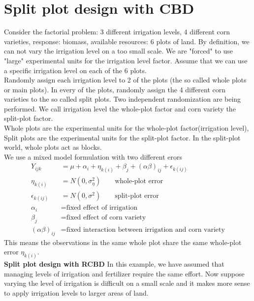 
 \section{Split plot design with CBD} 
 
 Consider the factorial problem: 3 different irrigation levels, 4 different corn varieties, response: biomass, available resources: 6 plots of land. By definition, we can not vary the irrigation level on a too small scale. We are "forced" to use "large" experimental units for the irrigation level factor. Assume that we can use a specific irrigation level on each of the 6 plots.\\
Randomly assign each irrigation level to 2 of the plots (the so called whole plots or main plots). In every of the plots, randomly assign the 4 different corn varieties to the so called split plots. Two independent randomization are being performed. We call irrigation level the whole-plot factor and corn variety the split-plot factor.\\
Whole plots are the experimental units for the whole-plot factor(irrigation level), Split plots are the experimental units for the split-plot factor. In the split-plot world, whole plots act as blocks. \\
We use a mixed model formulation with two different erors\\
\begin{align*}
Y_{ijk} &= \mu + \alpha_i + \eta_{k(i)} + \beta_j + (\alpha\beta)_{ij} + \epsilon_{k(ij)}\\
\eta_{k(i)} &= N(0, \sigma_{\eta}^2) \qquad \text{whole-plot error} \\
\epsilon_{k(ij)} &= N(0, \sigma^2) \qquad \text{split-plot error} \\
\alpha_i &= \text{fixed effect of irrigation}\\
\beta_j &= \text{fixed effect of corn variety}\\
(\alpha\beta)_{ij} &= \text{fixed interaction between irrigation and corn variety}
\end{align*} 
This means the observations in the same whole plot share the same whole-plot error $\eta_{k(i)}$.\\

\textbf{Split plot design with RCBD} In this example, we have assumed that managing levels of irrigation and fertilizer require the same effort. Now suppose varying the level of irrigation is difficult on a small scale and it makes more sense to apply irrigation levels to larger areas of land. \\


